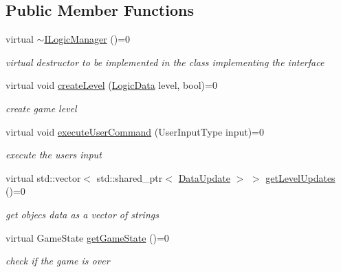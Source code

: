 \subsection*{Public Member Functions}
\begin{DoxyCompactItemize}
\item 
\mbox{\label{class_i_logic_manager_af522c957cdce66d34eb8264212b413ed}} 
virtual \mbox{\hyperlink{class_i_logic_manager_af522c957cdce66d34eb8264212b413ed}{$\sim$\+I\+Logic\+Manager}} ()=0
\begin{DoxyCompactList}\small\item\em virtual destructor to be implemented in the class implementing the interface \end{DoxyCompactList}\item 
\mbox{\label{class_i_logic_manager_a9d09e24fdfa312e3a908c0110e305ed5}} 
virtual void \mbox{\hyperlink{class_i_logic_manager_a9d09e24fdfa312e3a908c0110e305ed5}{create\+Level}} (\mbox{\hyperlink{class_logic_data}{Logic\+Data}} level, bool)=0
\begin{DoxyCompactList}\small\item\em create game level \end{DoxyCompactList}\item 
\mbox{\label{class_i_logic_manager_a531478a93285f5cdf6f22294638b27b3}} 
virtual void \mbox{\hyperlink{class_i_logic_manager_a531478a93285f5cdf6f22294638b27b3}{execute\+User\+Command}} (User\+Input\+Type input)=0
\begin{DoxyCompactList}\small\item\em execute the users input \end{DoxyCompactList}\item 
\mbox{\label{class_i_logic_manager_a9b783cc9ee7960b67d66549d77c601b5}} 
virtual std\+::vector$<$ std\+::shared\+\_\+ptr$<$ \mbox{\hyperlink{class_data_update}{Data\+Update}} $>$ $>$ \mbox{\hyperlink{class_i_logic_manager_a9b783cc9ee7960b67d66549d77c601b5}{get\+Level\+Updates}} ()=0
\begin{DoxyCompactList}\small\item\em get objec\textquotesingle{}s data as a vector of strings \end{DoxyCompactList}\item 
\mbox{\label{class_i_logic_manager_a2e7dcfd57979507839aa885d6de2889a}} 
virtual Game\+State \mbox{\hyperlink{class_i_logic_manager_a2e7dcfd57979507839aa885d6de2889a}{get\+Game\+State}} ()=0
\begin{DoxyCompactList}\small\item\em check if the game is over \end{DoxyCompactList}\end{DoxyCompactItemize}


